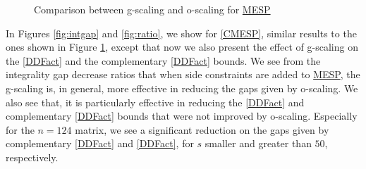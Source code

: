 \documentclass[smallextended]{svjour3hack}       %
\begin{document}
{\begin{figure}
        \caption[ ]
        {\small Comparison between g-scaling and o-scaling for \hyperlink{MESP}{MESP}}
        \label{fig:unconst}
    \end{figure}





In Figures  \ref{fig:intgap} and \ref{fig:ratio}, we show for \ref{CMESP}, similar results  to the ones shown in Figure \ref{fig:unconst}, except that now we also present the effect of g-scaling on  the \ref{DDFact} and the complementary \ref{DDFact} bounds. We see from the integrality gap decrease ratios that when side constraints are added to  \hyperlink{MESP}{MESP}, the g-scaling is, in general, more effective in reducing the gaps given by o-scaling. We also see that,   it is particularly  effective in reducing the \ref{DDFact} and complementary \ref{DDFact} bounds that were not improved by o-scaling. Especially for the $n=124$ matrix, we see a significant reduction on the gaps given by complementary \ref{DDFact} and \ref{DDFact}, for $s$ smaller and greater than  $50$, respectively.

}
\end{document}
